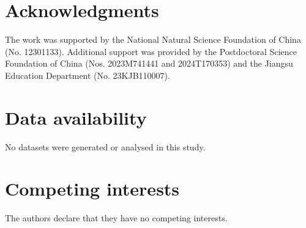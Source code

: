 \documentclass[12pt]{article}
\numberwithin{equation}{section}
\numberwithin{equation}{section}
\begin{document}
\section*{Acknowledgments}
The work was supported by the National Natural Science Foundation of China (No. 12301133). Additional support was provided by the Postdoctoral Science Foundation of China (Nos. 2023M741441 and 2024T170353) and the Jiangsu Education Department (No. 23KJB110007).

\section*{Data availability}
No datasets were generated or analysed in this study.


\section*{Competing interests}
The authors declare that they have no
competing interests.
\end{document}

